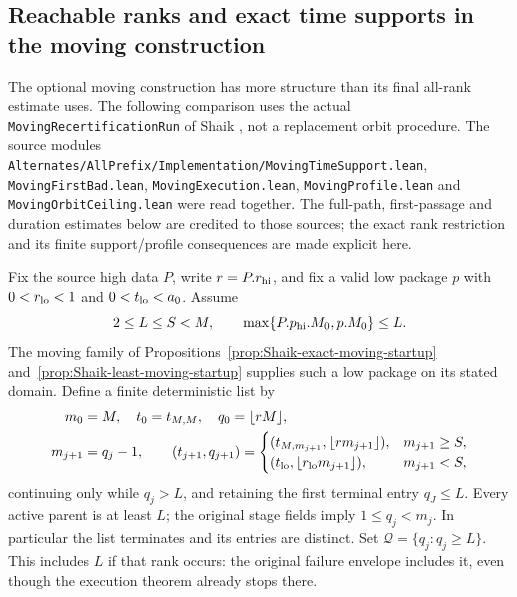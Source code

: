 \subsection{Reachable ranks and exact time supports in the moving construction}

The optional moving construction has more structure than its final
all-rank estimate uses. The following comparison uses the actual
\texttt{MovingRecertificationRun} of Shaik
\cite{Shaik2026v324}, not a replacement orbit procedure.
The source modules
\texttt{Alternates/AllPrefix/Implementation/MovingTimeSupport.lean},
\texttt{MovingFirstBad.lean}, \texttt{MovingExecution.lean},
\texttt{MovingProfile.lean} and \texttt{MovingOrbitCeiling.lean}
were read together. The full-path, first-passage and duration estimates
below are credited to those sources; the exact rank restriction and
its finite support/profile consequences are made explicit here.

Fix the source high data \(P\), write \(r=P.r_{\rm hi}\), and fix
a valid low package \(p\) with \(0<r_{\rm lo}<1\) and
\(0<t_{\rm lo}<a_0\). Assume
\[
 2\le L\le S<M,\qquad
 \max\{P.p_{\rm hi}.M_0,p.M_0\}\le L.
\]
The moving family of Propositions~\ref{prop:Shaik-exact-moving-startup}
and~\ref{prop:Shaik-least-moving-startup} supplies such a low package
on its stated domain. Define a finite deterministic list by
\begin{align}
 m_0&=M,\quad t_0=t_{M,M},\quad q_0=\lfloor rM\rfloor,\nonumber\\
 m_{j+1}&=q_j-1,\qquad
 (t_{j+1},q_{j+1})=
 \begin{cases}
 (t_{M,m_{j+1}},\lfloor r m_{j+1}\rfloor),&m_{j+1}\ge S,\\
 (t_{\rm lo},\lfloor r_{\rm lo}m_{j+1}\rfloor),&m_{j+1}<S,
 \end{cases}
 \label{eq:Shaik-moving-reachable-ranks}
\end{align}
continuing only while \(q_j>L\), and retaining the first terminal
entry \(q_J\le L\). Every active parent is at least \(L\);
the original stage fields imply \(1\le q_j<m_j\).
In particular the list terminates and its entries are distinct.
Set \(\mathcal Q=\{q_j:q_j\ge L\}\). This includes \(L\) if that
rank occurs: the original failure envelope includes it, even though
the execution theorem already stops there.

